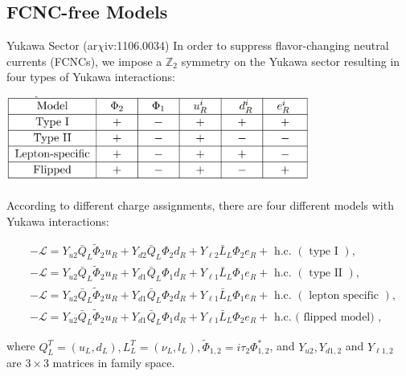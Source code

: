 \documentclass{../bredelebeamer}
\newcommand{\arxiv}{ar$\chi$iv:}
\begin{document}
\subsection{FCNC-free Models}
\begin{frame}{Yukawa Sector (\arxiv 1106.0034)}
    In order to suppress flavor-changing neutral currents (FCNCs), we impose a $\mathbb{Z}_2$ symmetry on the Yukawa sector resulting in four types of Yukawa interactions:
    \begin{center}
        \includegraphics[width=0.75\textwidth]{Table_Z2_charges.png}
    \end{center}
    According to different charge assignments, there are four different models with Yukawa interactions:

    $$
    \begin{aligned}
    & -\mathcal{L}=Y_{u 2} \bar{Q}_L \tilde{\Phi}_2 u_R+Y_{d 2} \bar{Q}_L \Phi_2 d_R+Y_{\ell 2} \bar{L}_L \Phi_2 e_R+\text { h.c. }(\text { type I }), \\
    & -\mathcal{L}=Y_{u 2} \bar{Q}_L \tilde{\Phi}_2 u_R+Y_{d 1} \bar{Q}_L \Phi_1 d_R+Y_{\ell 1} \bar{L}_L \Phi_1 e_R+\text { h.c. }(\text { type II }), \\
    & -\mathcal{L}=Y_{u 2} \bar{Q}_L \tilde{\Phi}_2 u_R+Y_{d 1} \bar{Q}_L \Phi_2 d_R+Y_{\ell 1} \bar{L}_L \Phi_1 e_R+\text { h.c. }(\text { lepton specific }), \\
    & -\mathcal{L}=Y_{u 2} \bar{Q}_L \tilde{\Phi}_2 u_R+Y_{d 1} \bar{Q}_L \Phi_1 d_R+Y_{\ell 1} \bar{L}_L \Phi_2 e_R+\text { h.c. ( flipped model) },
    \end{aligned}
    $$

    where $Q_L^T=\left(u_L, d_L\right), L_L^T=\left(\nu_L, l_L\right), \widetilde{\Phi}_{1,2}=i \tau_2 \Phi_{1,2}^*$, and $Y_{u 2}, Y_{d 1,2}$ and $Y_{\ell 1,2}$ are $3 \times 3$ matrices in family space.
\end{frame}
\end{document}

